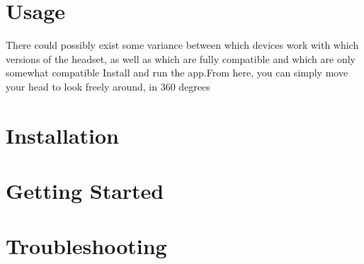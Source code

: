 \documentclass[english]{article}
\begin{document}
\section{Usage} 
There could possibly exist some variance between which devices work with which versions of the headset, as well as which are fully compatible and which are only somewhat compatible \newline
\newline
Install and run the app.\newline From here, you can simply move your head to look freely around, in 360 degrees

\section{Installation}

\section{Getting Started}

\section{Troubleshooting}
\end{document}
